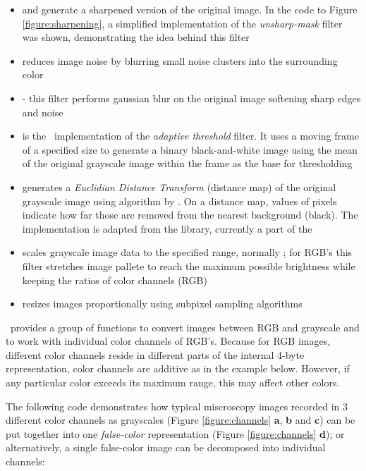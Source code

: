 \begin{itemize}
    \setlength{\itemsep}{0in}
    \item {} and  generate a sharpened version of the original image. In the code to Figure \ref{figure:sharpening}, a simplified implementation of the {\em unsharp-mask} filter was shown, demonstrating the idea behind this filter
    \item {} reduces image noise by blurring small noise clusters into the surrounding color
    \item {} - this filter performs gaussian blur on the original image softening sharp edges and noise
    \item {} is the \EBImage\ implementation of the {\em adaptive threshold} filter. It uses a moving frame of a specified size to generate a binary black-and-white image using the mean of the original grayscale image within the frame as the base for thresholding
    \item {} generates a {\em Euclidian Distance Transform} (distance map) of the original grayscale image using algorithm by \citep{R:Lotufo+Zampirolli:2001}. On a distance map, values of pixels indicate how far those are removed from the nearest background (black). The implementation is adapted from the  library, currently a part of the  \citep{R:SIP:2005}
    \item {} scales grayscale image data to the specified range, normally \code{[0..1]}; for RGB's this filter stretches image pallete to reach the maximum possible brightness while keeping the ratios of color channels (RGB)
    \item {} resizes images proportionally using subpixel sampling algorithms
\end{itemize}

\EBImage\ provides a group of functions to convert images between RGB and grayscale and to work with individual color channels of RGB's. Because for RGB images, different color channels reside in different parts of the internal 4-byte representation, color channels are additive as in the example below. However, if any particular color exceeds its maximum range, this may affect other colors.

The following code demonstrates how typical miscroscopy images recorded in 3 different color channels as grayscales (Figure \ref{figure:channels} {\bf a}, {\bf b} and {\bf c}) can be put together into one {\em false-color} representation (Figure \ref{figure:channels} {\bf d}); or alternatively, a single false-color image can be decomposed into individual channels:

